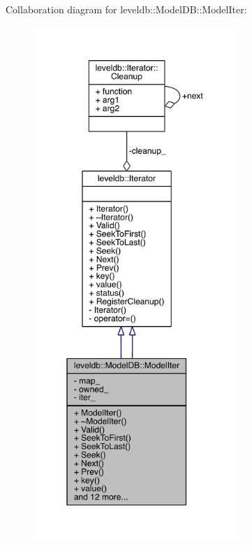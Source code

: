 Collaboration diagram for leveldb\+:\+:Model\+D\+B\+:\+:Model\+Iter\+:\nopagebreak
\begin{figure}[H]
\begin{center}
\leavevmode
\includegraphics[height=550pt]{classleveldb_1_1_model_d_b_1_1_model_iter__coll__graph}
\end{center}
\end{figure}
